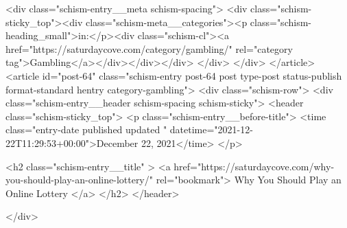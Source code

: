 {		<div class="schism-entry__meta schism-spacing">			<div class="schism-sticky_top"><div class="schism-meta__categories"><p class="schism-heading_small">in:</p><div class="schism-cl"><a href="https://saturdaycove.com/category/gambling/" rel="category tag">Gambling</a></div></div></div>		</div>
	</div>
</article>
<article id="post-64" class="schism-entry post-64 post type-post status-publish format-standard hentry category-gambling">
	<div class="schism-row">		<div class="schism-entry__header schism-spacing schism-sticky">			<header class="schism-sticky_top">				<p class="schism-entry__before-title">
					<time class="entry-date published updated " datetime="2021-12-22T11:29:53+00:00">December 22, 2021</time>				</p>

				<h2 class="schism-entry__title" >
					<a href="https://saturdaycove.com/why-you-should-play-an-online-lottery/" rel="bookmark">
						Why You Should Play an Online Lottery					</a>
				</h2>
			</header>

					</div>

}
